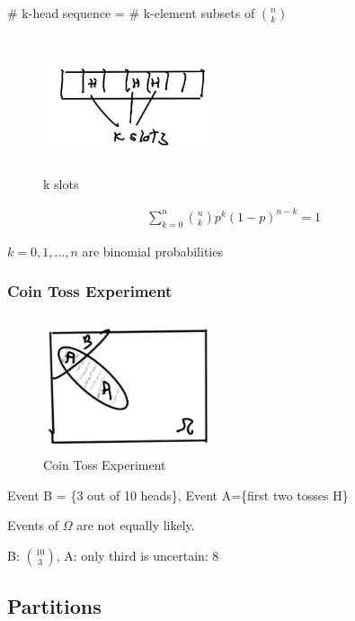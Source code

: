 
\# k-head sequence = \# k-element subsets of $\binom{n}{k}$

\begin{figure}[h]
\centering
\includegraphics[width=5cm, height=4cm]{images/L04/k_slots.jpeg}
\caption{k slots}
\end{figure}

\begin{align}
\sum_{k=0}^{n} \binom{n}{k} p^k(1-p)^{n-k}=1  
\label{eq:binomial_pmf}
\end{align}


$k=0,1,\ldots,n$ are binomial probabilities

\subsubsection{Coin Toss Experiment}

\begin{figure}[h]
\centering
\includegraphics[width=5cm, height=4cm]{images/L04/coin_toss_exp.jpeg}
\caption{Coin Toss Experiment}
\end{figure}

Event B = \{3 out of 10 heads\}, Event A=\{first two tosses H\}

Events of $\Omega$ are not equally likely.

B: $\binom{10}{3}$, A: only third is uncertain: 8

\subsection{Partitions}

